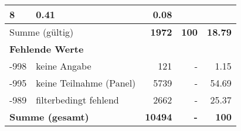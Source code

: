 \begin{longtable}{lXrrr}
       \num{8} &
       \num[round-mode=places,round-precision=2]{0,41} &
         \num[round-mode=places,round-precision=2]{0,08} \\
     \midrule
     \multicolumn{2}{l}{Summe (gültig)} &
       \textbf{\num{1972}} &
     \textbf{100} &
       \textbf{\num[round-mode=places,round-precision=2]{18,79}} \\
     \multicolumn{5}{l}{\textbf{Fehlende Werte}}\\
       -998 &
       keine Angabe &
         \num{121} &
        - &
         \num[round-mode=places,round-precision=2]{1,15} \\
       -995 &
       keine Teilnahme (Panel) &
         \num{5739} &
        - &
         \num[round-mode=places,round-precision=2]{54,69} \\
       -989 &
       filterbedingt fehlend &
         \num{2662} &
        - &
         \num[round-mode=places,round-precision=2]{25,37} \\
     \midrule
     \multicolumn{2}{l}{\textbf{Summe (gesamt)}} &
          \textbf{\num{10494}} &
        \textbf{-} &
        \textbf{100} \\
     \bottomrule
     \end{longtable}
     
